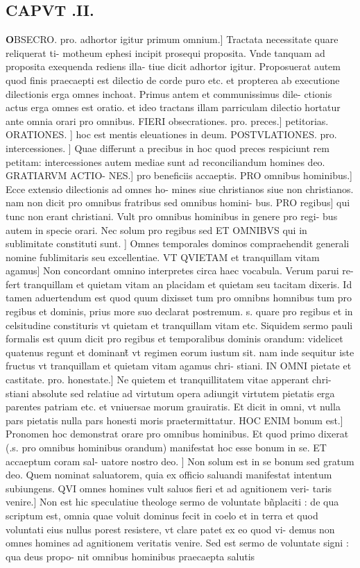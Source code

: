 \documentclass{article}
\begin{document}
\begin{pages}
\endnumbering\beginnumbering\section{CAPVT .II.}\pstart \huge\textbf{O}\normalsize BSECRO. pro. adhortor  igitur primum omnium.] Tractata necessitate quare reliquerat ti- motheum ephesi  incipit prosequi proposita. Vnde tanquam ad proposita exequenda rediens  illa- tiue dicit adhortor igitur. Proposuerat autem quod finis praecaepti est dilectio de corde puro etc.  et propterea ab executione dilectionis erga omnes inchoat. Primus antem et communissimus dile- ctionis actus erga omnes est oratio. et ideo tractans illam parriculam dilectio  hortatur ante omnia orari pro omnibus. FIERI obsecrationes. pro. preces.] petitorias. ORATIONES. ] hoc est mentis eleuationes in deum. POSTVLATIONES. pro. intercessiones. ] Quae differunt a precibus in hoc quod preces respiciunt rem petitam: intercessiones autem mediae sunt ad reconciliandum homines deo. GRATIARVM ACTIO- NES.] pro beneficiis accaeptis. PRO omnibus hominibus.] Ecce extensio dilectionis ad omnes ho- mines siue christianos siue non christianos. nam non dicit pro omnibus fratribus sed omnibus homini- bus. PRO regibus] qui tunc non erant christiani. Vult pro omnibus hominibus in genere  pro regi- bus autem in specie orari. Nec solum pro regibus sed ET OMNIBVS qui in sublimitate constituti sunt. ] Omnes temporales dominos compraehendit  generali nomine fublimitaris seu excellentiae. VT QVIETAM et tranquillam vitam agamus] Non concordant omnino interpretes circa haec vocabula. Verum parui re- fert tranquillam et quietam vitam an placidam et quietam seu tacitam dixeris. Id tamen aduertendum est quod quum dixisset tum pro omnibns homnibus tum pro regibus et dominis, prius more suo declarat postremum. s. quare pro regibus et in celsitudine constituris  vt quietam et tranquillam vitam etc.  Siquidem sermo pauli formalis est  quum dicit pro regibus et temporalibus dominis orandum: videlicet quatenus regunt et dominant̃ vt regimen eorum iustum sit. nam inde sequitur iste fructus vt tranquillam et quietam vitam agamus chri- stiani. IN OMNI pietate et castitate. pro. honestate.] Ne quietem et tranquillitatem vitae apperant chri- stiani absolute sed relatiue ad virtutum opera  adiungit virtutem pietatis erga parentes patriam etc.  et vniuersae morum grauiratis. Et dicit in omni, vt nulla pars pietatis  nulla pars honesti moris praetermittatur.  \pend\pstart HOC ENIM bonum est.] Pronomen hoc demonstrat orare pro omnibus hominibus. Et quod primo dixerat (.s. pro omnibus hominibus orandum) manifestat hoc esse bonum in se. ET accaeptum coram sal- uatore nostro deo. ] Non solum est in se bonum sed gratum deo. Quem nominat saluatorem, quia ex officio saluandi manifestat intentum  subiungens. QVI omnes homines vult saluos fieri et ad agnitionem veri- taris venire.] Non est hic speculatiue theologe sermo de voluntate bñplaciti : de qua scriptum est, omnia quae voluit dominus fecit in coelo et in terra et quod voluntati eius nullus porest resistere, vt clare patet ex eo quod vi- demus non omnes homines ad agnitionem veritatis venire. Sed est sermo de voluntate signi : qua deus propo- nit omnibus hominibus praecaepta salutis 
\end{pages}
\end{document}
